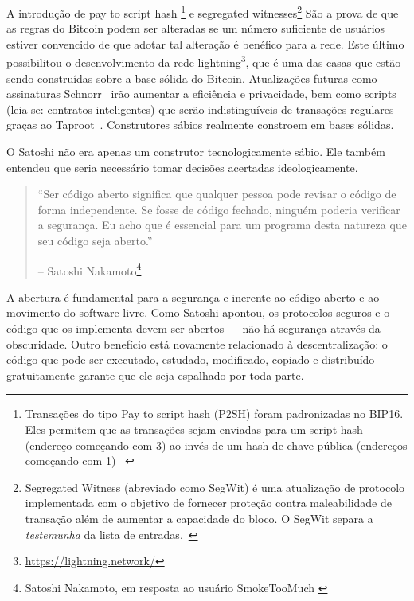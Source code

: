 A introdução de pay to script hash \footnote{Transações do tipo Pay to script hash (P2SH) foram padronizadas no BIP16. Eles permitem que as transações sejam enviadas para um script hash (endereço começando com 3) ao invés de um hash de chave pública (endereços começando com 1) ~\cite{btcwiki:p2sh}} e segregated witnesses\footnote{Segregated Witness (abreviado como SegWit) é uma atualização de protocolo implementada com o objetivo de fornecer proteção contra maleabilidade de transação além de aumentar a capacidade do bloco. O SegWit separa a \textit{testemunha} da lista de entradas.~\cite{btcwiki:segwit}} São a prova de que as regras do Bitcoin podem ser alteradas se um número suficiente de usuários estiver convencido de que adotar tal alteração é benéfico para a rede. Este último possibilitou o desenvolvimento da rede lightning\footnote{\url{https://lightning.network/}}, que é uma das casas que estão sendo construídas sobre a base sólida do Bitcoin. Atualizações futuras como assinaturas Schnorr~\cite{bip:schnorr} irão aumentar a eficiência e privacidade, bem como scripts (leia-se: contratos inteligentes) que serão indistinguíveis de transações regulares graças ao Taproot~\cite{taproot}. Construtores sábios realmente constroem em bases sólidas.

O Satoshi não era apenas um construtor tecnologicamente sábio. Ele também entendeu que seria necessário tomar decisões acertadas ideologicamente.

\begin{quotation}\begin{samepage}
\enquote{Ser código aberto significa que qualquer pessoa pode revisar o código de forma independente. Se fosse de código fechado, ninguém poderia verificar a segurança. Eu acho que é essencial para um programa desta natureza que seu código seja aberto.}
\begin{flushright} -- Satoshi Nakamoto\footnote{Satoshi Nakamoto, em resposta ao usuário SmokeTooMuch \cite{satoshi-open-source}}
\end{flushright}\end{samepage}\end{quotation}

A abertura é fundamental para a segurança e inerente ao código aberto e ao movimento do software livre. Como Satoshi apontou, os protocolos seguros e o código que os implementa devem ser abertos --- não há segurança através da obscuridade. Outro benefício está novamente relacionado à descentralização: o código que pode ser executado, estudado, modificado, copiado e distribuído gratuitamente garante que ele seja espalhado por toda parte.


